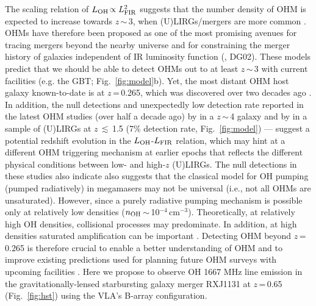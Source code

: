 \documentclass[letterpaper,11pt]{article}
\newcommand{\Lsun}{\mbox{$L_{\odot}$}\xspace}
\newcommand{\LIR}{\mbox{$L_{\rm IR}$}\xspace}
\newcommand{\LFIR}{\mbox{$L_{\rm FIR}$}\xspace}
\newcommand{\LOH}{$L_{\rm OH}$\xspace}
\newcommand{\Fig}[1]{Fig.~\ref{fig:#1}}
\newcommand{\E}[1]{\mbox{$\times10^{#1}$}}
\newcommand{\eq}{\,=\,}
\newcommand{\ssim}{\,$\sim$\,}
\begin{document}
The scaling relation of $L_{\rm OH}$$\propto L_{\rm FIR}^{2}$ 
\citep[or  $L_{\rm OH}$$\propto L_{\rm FIR}^{1.2}$ with Malmquist bias correction; \Fig{model}a; ][hereafter DG02]{Baan89a, Darling02b_LF} 
suggests that the number density of OHM is expected to increase towards $z$\ssim3,
when (U)LIRGs/mergers are more common \citep[e.g.,][]{LeFloch05a, Magnelli09a}.
OHMs have therefore been proposed as one of the most promising avenues for tracing mergers beyond the nearby universe
and for constraining the merger history of galaxies 
independent of IR luminosity function (\citealt{Briggs98a}, DG02). 
These models predict%
that we should be able to detect OHMs out to at least $z$\ssim3 with current facilities 
(e.g. the GBT; \Fig{model}b). Yet, 
the most distant OHM host galaxy known-to-date is at $z$\eq0.265, which was 
discovered over two decades ago \citep{Baan92a}.
In addition, the null detections and unexpectedly low detection rate 
reported in the latest OHM studies (over half a decade ago) 
by \citet{Ivison06a} in a $z$\ssim4 galaxy %
and by \citet{Willett12a} in a sample of (U)LIRGs at $z$\,$\lesssim$\,1.5 (7\% detection rate, \Fig{model}) --- %
suggest a potential redshift evolution in the \LOH-\LFIR relation, which may hint at a different 
OHM triggering mechanism at earlier epochs that reflects the different physical conditions between
low- and high-$z$ (U)LIRGs.
The null detections in these studies also indicate also suggests that the 
classical model for OH pumping (pumped radiatively) in megamasers may not be universal (i.e., not all OHMs are unsaturated).
However, since a purely radiative pumping mechanism is possible only at relatively low densities ($n_{\rm OH}$\ssim10$^{-4}$\,cm$^{-3}$). 
Theoretically, at relatively high OH densities, collisional processes may predominate. 
In addition, at high densities saturated amplification can be important \citep{Field94a}.
Detecting OHM beyond $z$\eq0.265 is therefore crucial to 
enable a better understanding of OHM and to 
improve existing predictions used for planning future OHM surveys with upcoming facilities 
\citep[e.g., FAST, APERTIF/WSRT, ASKAP;][]{Zhang14b}.
Here we propose to observe OH 1667 MHz line emission in the 
gravitationally-lensed starbursting galaxy merger
RXJ1131 at $z$\eq0.65 (\Fig{hst}) using the VLA's B-array configuration. 
\end{document}
